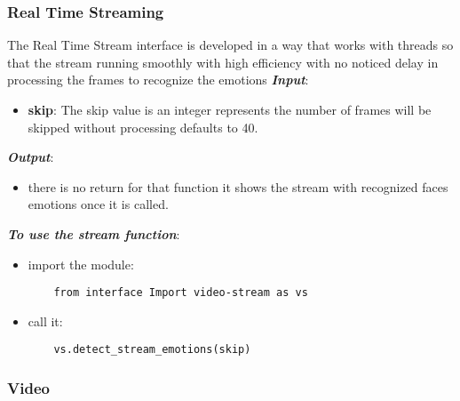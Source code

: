 \subsubsection{Real Time Streaming}
The Real Time Stream interface is developed in a way that works with threads so that the stream running smoothly with high efficiency with no noticed delay in processing the frames to recognize the emotions 
\bigbreak 
\noindent\textbf{\textit{Input}}:
\begin{itemize}
	\item \textbf{skip}:\newline
	The skip value is an integer represents the number of frames will be skipped without processing defaults to 40.
\end{itemize}
\noindent\textbf{\textit{Output}}:
\begin{itemize}
	\item there is no return for that function it shows the stream with recognized faces emotions once it is called.
\end{itemize}
\noindent\textbf{\textit{To use the stream function}}:
\begin{itemize}
	\item import the module:
	\begin{verbatim}
	from interface Import video-stream as vs
	\end{verbatim}
	\item call it:
	\begin{verbatim}
	vs.detect_stream_emotions(skip)
	\end{verbatim}
\end{itemize}

\newpage

\subsubsection{Video}

